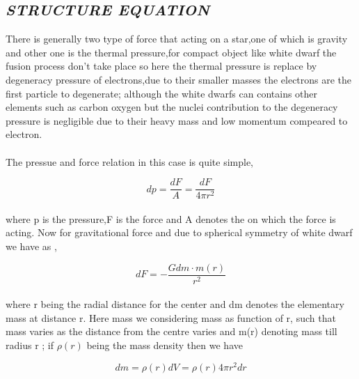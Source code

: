 \documentclass{report}
\begin{document}
\paragraph{ }
\subsection{\textit{STRUCTURE EQUATION}}
There is generally two type of force that acting on a star,one of which is gravity and other one is the thermal pressure,for compact object like white dwarf the fusion process don't take place so here the thermal pressure is replace by degeneracy pressure of electrons,due to their smaller masses the electrons are the first particle to degenerate; although the white dwarfs can contains other elements such as carbon oxygen but the nuclei contribution to the degeneracy pressure is negligible due to their heavy mass and low momentum compeared to electron.
\paragraph{ }
The pressue and force relation in this case is quite simple,
\begin{center}
\begin{equation}
dp = \frac{dF}{A} = \frac{dF}{4\pi r^2}
\label{1}
\end{equation}
\end{center}
\paragraph{ }
where p is the pressure,F is the force and A denotes the on which the force is acting. Now for gravitational force and due to spherical symmetry of white dwarf we have as ,
\begin{center}
\begin{equation}
dF = -\frac{Gdm\cdot m(r)}{r^2}
\label{2}
\end{equation}
\end{center}
\paragraph{}
where r being the radial distance for the center and dm denotes the elementary mass at distance r. Here mass we considering mass as function of r, such that mass varies as the distance from the centre varies and m(r) denoting mass till radius r ; if $\rho(r)$ being the mass density then we have 
\begin{center}
\begin{equation}
dm = \rho(r)dV = \rho(r)4\pi r^2 dr
\label{3}
\end{equation}
\end{center}
\end{document}
